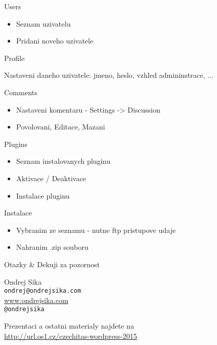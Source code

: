 \documentclass{beamer}
\begin{document}
\begin{frame}
    {Users}

    \begin{itemize}
        \item Seznam uzivatelu
        \item Pridani noveho uzivatele
    \end{itemize}
\end{frame}


\begin{frame}
    {Profile}

    Nastaveni daneho uzivatele: jmeno, heslo, vzhled admininstrace, ...
\end{frame}


\begin{frame}
    {Comments}

    \begin{itemize}
        \item Nastaveni komentaru - Settings -> Discussion
        \item Povolovani, Editace, Mazani
    \end{itemize}
\end{frame}


\begin{frame}
    {Plugins}

    \begin{itemize}
        \item Seznam instalovanych pluginu
        \item Aktivace / Deaktivace
        \item Instalace pluginu
    \end{itemize}
\end{frame}


\begin{frame}
    {Instalace}

    \begin{itemize}
        \item Vybranim ze seznamu - nutne ftp pristupove udaje
        \item Nahranim .zip souboru
    \end{itemize}
\end{frame}


\begin{frame}
    {Otazky \& Dekuji za pozornost}

    Ondrej Sika\\
    \texttt{ondrej@ondrejsika.com}\\
    \url{www.ondrejsika.com}\\
    \texttt{@ondrejsika}\\

    \vspace{1cm}

    Prezentaci a ostatni materialy najdete na\\
    \url{http://url.os1.cz/czechitas-wordpress-2015}
\end{frame}
\end{document}
